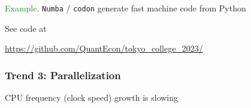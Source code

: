 \documentclass[
    xcolor={svgnames,dvipsnames},
    hyperref={colorlinks, citecolor=DeepPink4, linkcolor=DarkRed, urlcolor=DarkBlue}
    ]{beamer}  %
\newcommand{\Eg}{\textcolor{ForestGreen}{Example. }}
\newcommand{\1}{\mathbbm 1}
\begin{document}
\begin{frame}

    \Eg \texttt{Numba} / \texttt{codon} generate fast machine code from Python

    \vspace{0.5em}
    \vspace{0.5em}
    \vspace{0.5em}
    \vspace{0.5em}
    See code at
    \begin{center}
        \url{https://github.com/QuantEcon/tokyo_college_2023/}
    \end{center}

\end{frame}



    

\begin{frame}

    \frametitle{Trend 3: Parallelization}

    CPU frequency (clock speed) growth is slowing

    \begin{figure}
       \begin{center}
       \end{center}
    \end{figure}

\end{frame}
\end{document}
